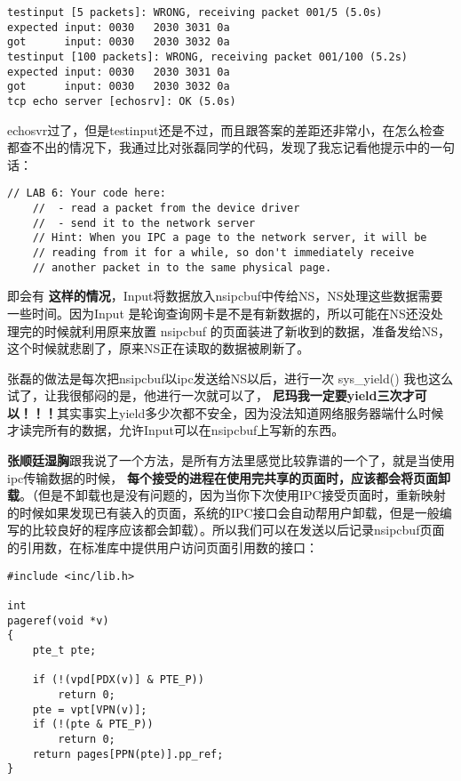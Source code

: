 \documentclass{article}
\newcommand{\highlight}[1]{{\bfseries \color{red}  #1}}
\newcommand{\funcname}[1]{{\ttfamily \small #1}}
\begin{document}
\begin{CJK*}{UTF8}{gkai}
\begin{lstlisting}[style=console]
testinput [5 packets]: WRONG, receiving packet 001/5 (5.0s)
expected input: 0030   2030 3031 0a
got      input: 0030   2030 3032 0a
testinput [100 packets]: WRONG, receiving packet 001/100 (5.2s)
expected input: 0030   2030 3031 0a
got      input: 0030   2030 3032 0a
tcp echo server [echosrv]: OK (5.0s)
\end{lstlisting}

echosvr过了，但是testinput还是不过，而且跟答案的差距还非常小，在怎么检查都查不出的情况下，我通过比对张磊同学的代码，发现了我忘记看他提示中的一句话：

\begin{lstlisting}[style=challenge]
    // LAB 6: Your code here:
    // 	- read a packet from the device driver
    //	- send it to the network server
    // Hint: When you IPC a page to the network server, it will be
    // reading from it for a while, so don't immediately receive
    // another packet in to the same physical page.
\end{lstlisting}

即会有\highlight{这样的情况}，Input将数据放入nsipcbuf中传给NS，NS处理这些数据需要一些时间。因为Input 是轮询查询网卡是不是有新数据的，所以可能在NS还没处理完的时候就利用原来放置 nsipcbuf 的页面装进了新收到的数据，准备发给NS，这个时候就悲剧了，原来NS正在读取的数据被刷新了。

张磊的做法是每次把nsipcbuf以ipc发送给NS以后，进行一次 \funcname{sys\_yield()} 我也这么试了，让我很郁闷的是，他进行一次就可以了，\highlight{尼玛我一定要yield三次才可以！！！}其实事实上yield多少次都不安全，因为没法知道网络服务器端什么时候才读完所有的数据，允许Input可以在nsipcbuf上写新的东西。

\highlight{张顺廷湿胸}跟我说了一个方法，是所有方法里感觉比较靠谱的一个了，就是当使用ipc传输数据的时候，\highlight{每个接受的进程在使用完共享的页面时，应该都会将页面卸载}。（但是不卸载也是没有问题的，因为当你下次使用IPC接受页面时，重新映射的时候如果发现已有装入的页面，系统的IPC接口会自动帮用户卸载，但是一般编写的比较良好的程序应该都会卸载）。所以我们可以在发送以后记录nsipcbuf页面的引用数，在标准库中提供用户访问页面引用数的接口：

\begin{lstlisting}[style=ccode, title={\scriptsize \ttfamily \bfseries lib/pageref.c}]
#include <inc/lib.h>

int
pageref(void *v)
{
	pte_t pte;

	if (!(vpd[PDX(v)] & PTE_P))
		return 0;
	pte = vpt[VPN(v)];
	if (!(pte & PTE_P))
		return 0;
	return pages[PPN(pte)].pp_ref;
}
\end{lstlisting}


\end{CJK*}
\end{document}
